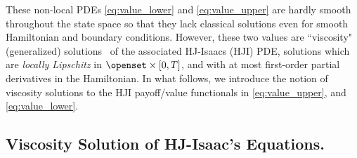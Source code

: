 These non-local PDEs \ie \eqref{eq:value_lower} and \eqref{eq:value_upper} are hardly smooth throughout the state space so that they  lack classical solutions even for smooth Hamiltonian and boundary conditions. However, these two values are ``viscosity" (generalized)  solutions~\cite{Lions1982, Crandall1983viscosity} of the associated HJ-Isaacs (HJI) PDE, \ie solutions which are \textit{locally Lipschitz} in $\openset \times [0, T]$, and with at most first-order partial derivatives in the Hamiltonian. In what follows, we introduce the notion of viscosity solutions to the HJI payoff/value functionals in \eqref{eq:value_upper}, and \eqref{eq:value_lower}.


\subsection{Viscosity Solution of HJ-Isaac's Equations.}
\label{subsec:visc}

